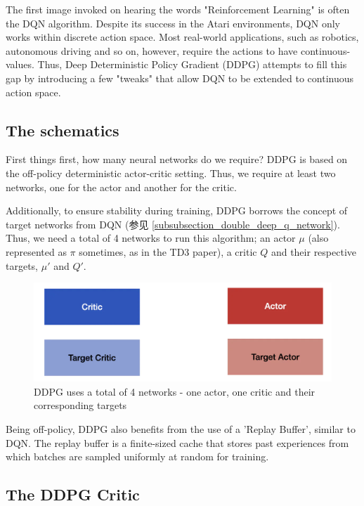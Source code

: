 The first image invoked on hearing the words "Reinforcement Learning" is often 
the DQN algorithm. Despite its success in the Atari environments, DQN only works 
within discrete action space. Most real-world applications, such as robotics, 
autonomous driving and so on, however, require the actions to have continuous-values. 
Thus, Deep Deterministic Policy Gradient (DDPG) attempts to fill this gap by 
introducing a few "tweaks" that allow DQN to be extended to continuous action space.


\subsection{The schematics}

First things first, how many neural networks do we require? DDPG is based on 
the off-policy deterministic actor-critic setting. Thus, we require at least two 
networks, one for the actor and another for the critic.

Additionally, to ensure stability during training, DDPG borrows the concept of 
target networks from DQN (参见 \ref{subsubsection_double_deep_q_network}). Thus, 
we need a total of 4 networks to run this algorithm; 
an actor $\mu$ (also represented as $\pi$ sometimes, as in the TD3 paper), a critic 
$Q$ and their respective targets, $\mu'$ and $Q'$.

\begin{figure}[H]
\centering
\includegraphics[scale=0.5]{pix/td3/ddpg_schematics.png}
\caption{DDPG uses a total of 4 networks - one actor, one critic and their 
corresponding targets}
\end{figure}

Being off-policy, DDPG also benefits from the use of a 'Replay Buffer', similar 
to DQN. The replay buffer is a finite-sized cache that stores past experiences 
from which batches are sampled uniformly at random for training.

\subsection{The DDPG Critic}

